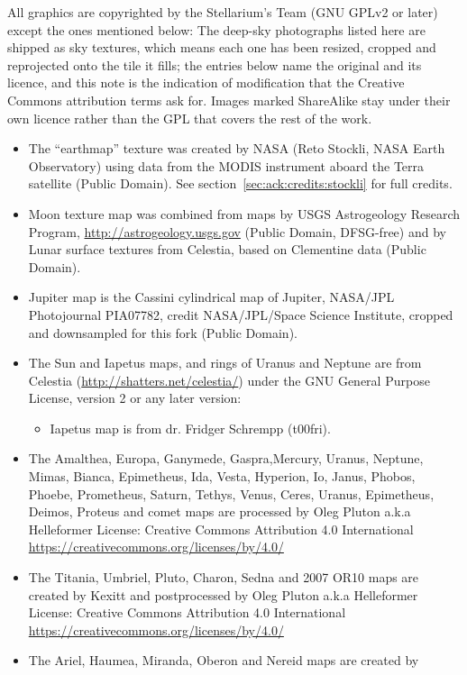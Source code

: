 All graphics are copyrighted by the Stellarium's Team (GNU GPLv2 or later) 
	except the ones mentioned below:
The deep-sky photographs listed here are shipped as sky textures, which means
each one has been resized, cropped and reprojected onto the tile it fills; the
entries below name the original and its licence, and this note is the
indication of modification that the Creative Commons attribution terms ask for.
Images marked ShareAlike stay under their own licence rather than the GPL that
covers the rest of the work.
\begin{itemize}
\item The ``earthmap'' texture was created by NASA (Reto Stockli, NASA Earth
	 Observatory) using data from the MODIS instrument aboard the
	 Terra satellite (Public Domain). See section~\ref{sec:ack:credits:stockli} for full
	 credits.
\item Moon texture map was combined from maps by USGS Astrogeology Research
	 Program,
	 \url{http://astrogeology.usgs.gov} (Public Domain, DFSG-free) and by Lunar
	 surface textures from Celestia, based on Clementine data (Public
	 Domain).
\item Jupiter map is the Cassini cylindrical map of Jupiter, NASA/JPL
	 Photojournal PIA07782, credit NASA/JPL/Space Science Institute,
	 cropped and downsampled for this fork (Public Domain).
\item The Sun and Iapetus maps, and rings of Uranus and Neptune
	 are from Celestia (\url{http://shatters.net/celestia/})
	 under the GNU General Purpose License, version 2 or any later
	 version:
\begin{itemize}	 
	 \item Iapetus map is from dr. Fridger Schrempp (t00fri).
\end{itemize}	 
\item The Amalthea, Europa, Ganymede, Gaspra,Mercury, Uranus, Neptune, Mimas,
	 Bianca, Epimetheus, Ida, Vesta, Hyperion, Io, Janus, Phobos, Phoebe, Prometheus,
	 Saturn, Tethys, Venus, Ceres, Uranus, Epimetheus, Deimos, Proteus and comet
   maps are processed by Oleg Pluton a.k.a Helleformer
	 License: Creative Commons Attribution 4.0 International \url{https://creativecommons.org/licenses/by/4.0/}
\item The Titania, Umbriel, Pluto, Charon, Sedna and 2007 OR10 maps are created
	 by Kexitt and postprocessed by Oleg Pluton a.k.a Helleformer
	 License: Creative Commons Attribution 4.0 International \url{https://creativecommons.org/licenses/by/4.0/}
\item The Ariel, Haumea, Miranda, Oberon and Nereid maps are created by 

\end{itemize}

